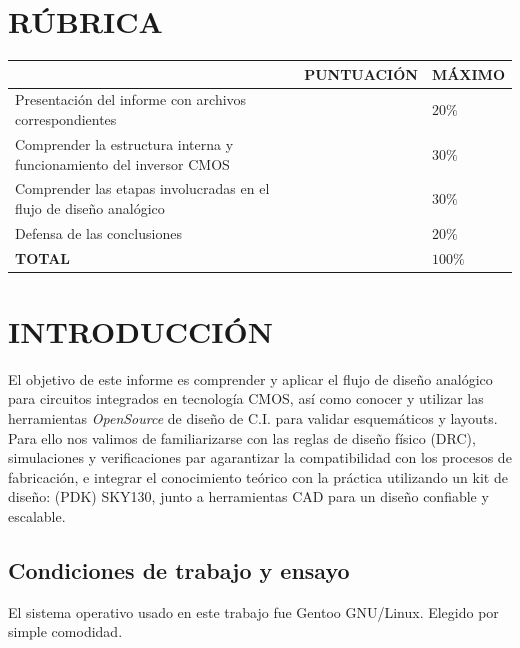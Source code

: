 \section{RÚBRICA}

\begin{center}

\begin{tabular}{|l|l|l|}
\hline
\rowcolor[HTML]{FFFFC7} 
\multicolumn{1}{|c|}{\cellcolor[HTML]{FFFFC7}\textbf{TAREA}}        & \multicolumn{1}{c|}{\cellcolor[HTML]{FFFFC7}\textbf{PUNTUACIÓN}} & \multicolumn{1}{c|}{\cellcolor[HTML]{FFFFC7}\textbf{MÁXIMO}} \\ \hline
Presentación del informe con archivos correspondientes              &                                                                  & $20\%$                                                       \\ \hline
Comprender la estructura interna y funcionamiento del inversor CMOS &                                                                  & $30\%$                                                       \\ \hline
Comprender las etapas involucradas en el flujo de diseño analógico  &                                                                  & $30\%$                                                       \\ \hline
Defensa de las conclusiones                                         &                                                                  & $20\%$                                                       \\ \hline
\cellcolor[HTML]{FFFFC7}\textbf{TOTAL}                              &                                                                  & $100\%$                                                      \\ \hline
\end{tabular}

\end{center}

\newpage

\section{INTRODUCCIÓN}
\sangria{} El objetivo de este informe es comprender y aplicar el flujo de diseño analógico para circuitos integrados en tecnología CMOS, así como conocer y utilizar las herramientas \textit{OpenSource} de diseño de C.I. para validar esquemáticos y layouts. Para ello nos valimos de familiarizarse con las reglas de diseño físico (DRC), simulaciones y verificaciones par agarantizar la compatibilidad con los procesos de fabricación, e integrar el conocimiento teórico con la práctica utilizando un kit de diseño: (PDK) SKY130, junto a herramientas CAD para un diseño confiable y escalable.

\subsection{Condiciones de trabajo y ensayo}
\sangria{} El sistema operativo usado en este trabajo fue Gentoo GNU/Linux. Elegido por simple comodidad.
